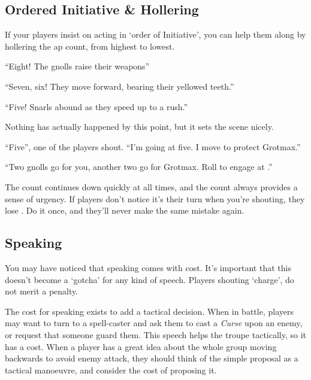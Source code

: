 \begin{multicols}{2}

\subsection{Ordered Initiative \& Hollering}

If your players insist on acting in `order of Initiative', you can help them along by hollering the \gls{ap} count, from highest to lowest.

\begin{speechtext}

``Eight! The gnolls raise their weapons''

``Seven, six! They move forward, bearing their yellowed teeth.''

``Five! Snarls abound as they speed up to a rush.''

\end{speechtext}

Nothing has actually happened by this point, but it sets the scene nicely.

\begin{speechtext}

  ``Five'', one of the players shout.
  ``I'm going at five.
  I move to protect Grotmax.''

  ``Two gnolls go for you, another two go for Grotmax.
  Roll to engage at \tn[11].''

\end{speechtext}

The count continues down quickly at all times, and the count always provides a sense of urgency.
If players don't notice it's their turn when you're shouting, they lose .
Do it once, and they'll never make the same mistake again.

\subsection{Speaking}

You may have noticed that speaking comes with  cost.
It's important that this doesn't become a `gotcha' for any kind of speech.
Players shouting `charge', do not merit a penalty.

The cost for speaking exists to add a tactical decision.
When in battle, players may want to turn to a spell-caster and ask them to cast a \textit{Curse} upon an enemy, or request that someone guard them.
This speech helps the troupe tactically, so it has a cost.
When a player has a great idea about the whole group moving backwards to avoid enemy attack, they should think of the simple proposal as a tactical manoeuvre, and consider the cost of proposing it.


\end{multicols}
